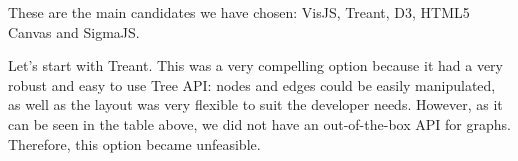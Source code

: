 \documentclass{l4proj}
\begin{document}
\begin{table}[!ht]
\centering
{}
\caption{Table showing features provided by the main drawing libraries for trees/graphs.}
\label{drawing-libraries}
\end{table}

These are the main candidates we have chosen: VisJS, Treant, D3, HTML5 Canvas and SigmaJS. 

Let's start with Treant. This was a very compelling option because it had a very robust and easy to use Tree API: nodes
and edges could be easily manipulated, as well as the layout was very flexible to suit the developer needs. However, as
it can be seen in the table above, we did not have an out-of-the-box API for graphs. Therefore, this option became unfeasible.
\end{document}
